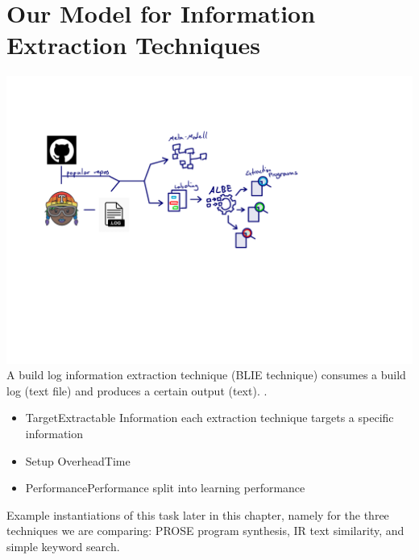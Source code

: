 \documentclass[\myrootdir/main.tex]{subfiles}
\begin{document}
\section{Our Model for Information Extraction Techniques}
\includegraphics[page=3, width=\textwidth, trim={0.5cm 0.5cm 0.5cm 0.5cm}, clip]{img/flow-of-research.pdf}
A build log information extraction technique (BLIE technique) consumes a build log (text file) and produces a certain output (text). .
\begin{itemize}
  \item{Target}{Extractable Information} each extraction technique  targets a specific information
  \item{Setup Overhead}{Time}
  \item{Performance}{Performance} split into learning performance
\end{itemize}

Example instantiations of this task later in this chapter, namely for the three techniques we are comparing: PROSE program synthesis, IR text similarity, and simple keyword search. 
\end{document}
